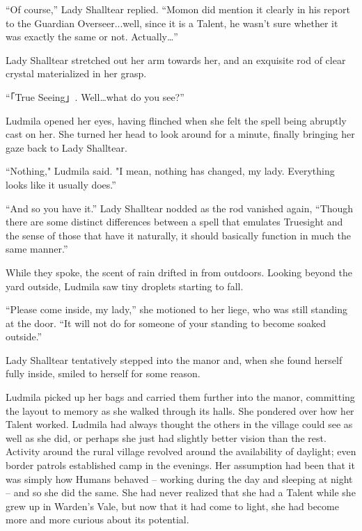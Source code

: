  

“Of course,” Lady Shalltear replied. “Momon did mention it clearly in his report to the Guardian Overseer...well, since it is a Talent, he wasn’t sure whether it was exactly the same or not. Actually…”

 

Lady Shalltear stretched out her arm towards her, and an exquisite rod of clear crystal materialized in her grasp.

 

“「True Seeing」. Well…what do you see?”

 

Ludmila opened her eyes, having flinched when she felt the spell being abruptly cast on her. She turned her head to look around for a minute, finally bringing her gaze back to Lady Shalltear.

 

“Nothing," Ludmila said. "I mean, nothing has changed, my lady. Everything looks like it usually does.”

 

“And so you have it.” Lady Shalltear nodded as the rod vanished again, “Though there are some distinct differences between a spell that emulates Truesight and the sense of those that have it naturally, it should basically function in much the same manner.”

 

While they spoke, the scent of rain drifted in from outdoors. Looking beyond the yard outside, Ludmila saw tiny droplets starting to fall.

 

“Please come inside, my lady,” she motioned to her liege, who was still standing at the door. “It will not do for someone of your standing to become soaked outside.”

 

Lady Shalltear tentatively stepped into the manor and, when she found herself fully inside, smiled to herself for some reason.

 

Ludmila picked up her bags and carried them further into the manor, committing the layout to memory as she walked through its halls. She pondered over how her Talent worked. Ludmila had always thought the others in the village could see as well as she did, or perhaps she just had slightly better vision than the rest. Activity around the rural village revolved around the availability of daylight; even border patrols established camp in the evenings. Her assumption had been that it was simply how Humans behaved – working during the day and sleeping at night – and so she did the same. She had never realized that she had a Talent while she grew up in Warden’s Vale, but now that it had come to light, she had become more and more curious about its potential.

